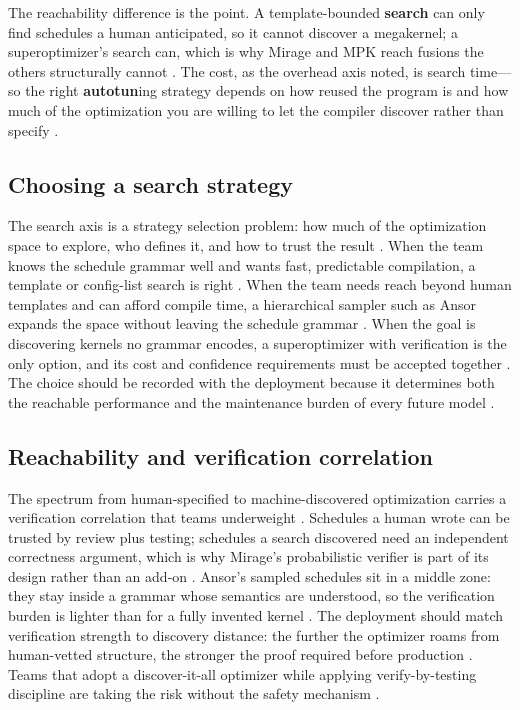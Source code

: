 The reachability difference is the point. A template-bounded \textbf{search} can only find schedules a human anticipated, so it cannot discover a megakernel; a superoptimizer's search can, which is why Mirage and MPK reach fusions the others structurally cannot \citep{wu2024mirage,mpk2025}. The cost, as the overhead axis noted, is search time---so the right \textbf{autotun}ing strategy depends on how reused the program is and how much of the optimization you are willing to let the compiler discover rather than specify \citep{kwon2023vllm,dlbook}.

\subsection{Choosing a search strategy}

The search axis is a strategy selection problem: how much of the optimization space to explore, who defines it, and how to trust the result \citep{wu2024mirage,zheng2020ansor,chen2018autotvm}. When the team knows the schedule grammar well and wants fast, predictable compilation, a template or config-list search is right \citep{chen2018autotvm,tritonlang2024}. When the team needs reach beyond human templates and can afford compile time, a hierarchical sampler such as Ansor expands the space without leaving the schedule grammar \citep{zheng2020ansor}. When the goal is discovering kernels no grammar encodes, a superoptimizer with verification is the only option, and its cost and confidence requirements must be accepted together \citep{wu2024mirage,mpk2025}. The choice should be recorded with the deployment because it determines both the reachable performance and the maintenance burden of every future model \citep{chen2020compilerbasedhardw,patel2025llminference}.

\subsection{Reachability and verification correlation}

The spectrum from human-specified to machine-discovered optimization carries a verification correlation that teams underweight \citep{wu2024mirage,patel2025llminference}. Schedules a human wrote can be trusted by review plus testing; schedules a search discovered need an independent correctness argument, which is why Mirage's probabilistic verifier is part of its design rather than an add-on \citep{wu2024mirage}. Ansor's sampled schedules sit in a middle zone: they stay inside a grammar whose semantics are understood, so the verification burden is lighter than for a fully invented kernel \citep{zheng2020ansor,chen2020compilerbasedhardw}. The deployment should match verification strength to discovery distance: the further the optimizer roams from human-vetted structure, the stronger the proof required before production \citep{wu2024mirage,taxbreak2026}. Teams that adopt a discover-it-all optimizer while applying verify-by-testing discipline are taking the risk without the safety mechanism \citep{wu2024mirage,memoryfloor2026}.

